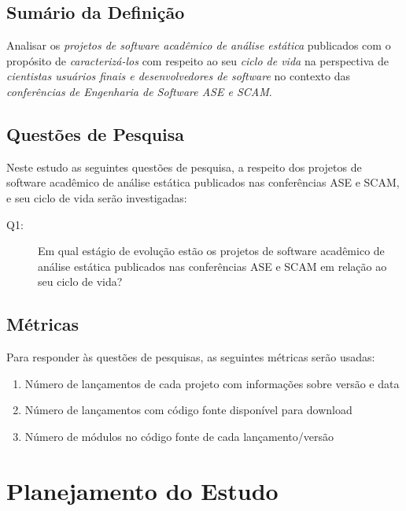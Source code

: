 \subsection{Sumário da Definição}

Analisar os \textit{projetos de software acadêmico de análise estática} publicados
com o propósito de \textit{caracterizá-los}
com respeito ao seu \textit{ciclo de vida}
na perspectiva de \textit{cientistas usuários finais e desenvolvedores de software}
no contexto das \textit{conferências de Engenharia de Software ASE e SCAM}.

\subsection{Questões de Pesquisa}

Neste estudo as seguintes questões de pesquisa, a respeito dos projetos de
software acadêmico de análise estática publicados nas conferências ASE e SCAM,
e seu ciclo de vida serão investigadas:

\newcommand{\EstudoTresQuestaoUm}{
  Em qual estágio de evolução estão os projetos de software acadêmico de
  análise estática publicados nas conferências ASE e SCAM em relação ao seu
  ciclo de vida?
}

\begin{description}
  \item [Q1:] \EstudoTresQuestaoUm
\end{description}

\subsection{Métricas}

Para responder às questões de pesquisas, as seguintes métricas serão usadas:

\begin{enumerate}
  \item Número de lançamentos de cada projeto com informações sobre versão e data
  \item Número de lançamentos com código fonte disponível para download
  \item Número de módulos no código fonte de cada lançamento/versão
\end{enumerate}


\section{Planejamento do Estudo} \label{estudo3:planejamento} %

